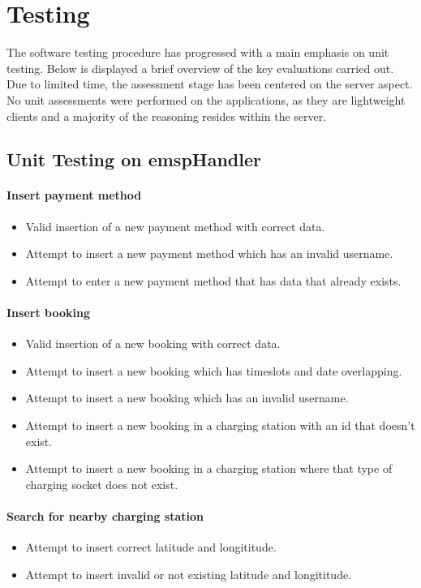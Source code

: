 \chapter{Testing}
The software testing procedure has progressed with a main emphasis on unit testing. Below is displayed a brief overview of the key evaluations carried out. Due to limited time, the assessment stage has been centered on the server aspect. No unit assessments were performed on the applications, as they are lightweight clients and a majority of the reasoning resides within the server.
\section{Unit Testing on emspHandler}
\subsubsection{Insert payment method}
\begin{itemize}
    \item Valid insertion of a new payment method with correct data.
    \item Attempt to insert a new payment method which has an invalid username.
    \item Attempt to enter a new payment method that has data that already exists.
\end{itemize}
\subsubsection{Insert booking}
\begin{itemize}
    \item Valid insertion of a new booking with correct data.
    \item Attempt to insert a new booking which has timeslots and date overlapping.
    \item Attempt to insert a new booking which has an invalid username.
    \item Attempt to insert a new booking in a charging station with an id that doesn't exist.
    \item Attempt to insert a new booking in a charging station where that type of charging socket does not exist.
\end{itemize}
\subsubsection{Search for nearby charging station}
\begin{itemize}
    \item Attempt to insert correct latitude and longititude.
    \item Attempt to insert invalid or not existing latitude and longititude.
\end{itemize}
